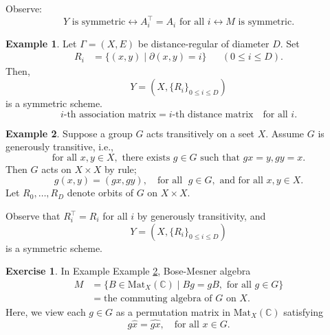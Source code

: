 \documentclass[
]{book}
\theoremstyle{definition}
\theoremstyle{definition}
\newtheorem{example}{Example}[chapter]
\theoremstyle{definition}
\newtheorem{exercise}{Exercise}[chapter]
\theoremstyle{definition}
\theoremstyle{remark}
\begin{document}
Observe:
\[Y \text{ is symmetric} \leftrightarrow A_i^\top = A_i \text{ for all } i \leftrightarrow M \text{ is symmetric}.\]

\begin{example}
\protect\hypertarget{exm:dr}{}\label{exm:dr}Let \(\Gamma = (X, E)\) be distance-regular of diameter \(D\). Set
\begin{align}
R_i & = \{(x,y)\mid \partial(x,y) = i\} && (0\leq i\leq D).
\end{align}
Then,
\[Y = (X, \{R_i\}_{0\leq i\leq D})\]
is a symmetric scheme.
\[i\text{-th association matrix} = i\text{-th distance matrix} \quad \text{for all $i$.}\]
\end{example}

\begin{example}
\protect\hypertarget{exm:gen-tr}{}\label{exm:gen-tr}Suppose a group \(G\) acts transitively on a seet \(X\). Assume \(G\) is generously transitive, i.e.,
\[\text{for all }x,y\in X, \text{ there exists }g\in G \text{ such that }gx = y, gy = x.\]
Then \(G\) acts on \(X\times X\) by rule;
\[g(x,y) = (gx, gy), \quad \text{for all }\; g\in G, \text{ and for all }x,y\in X.\]
Let \(R_0, \ldots, R_D\) denote orbits of \(G\) on \(X\times X\).

Observe that \(R_i^\top = R_i\) for all \(i\) by generously transitivity, and
\[Y = (X, \{R_i\}_{0\leq i\leq D})\]
is a symmetric scheme.
\end{example}

\begin{exercise}
\protect\hypertarget{exr:gen-tr-case}{}\label{exr:gen-tr-case}In Example Example \ref{exm:gen-tr}, Bose-Mesner algebra
\begin{align}
M & = \{B\in \mathrm{Mat}_X(\mathbb{C}) \mid Bg = gB, \text{ for all }g\in G\}\\
& = \text{the commuting algebra of $G$ on $X$.}
\end{align}
Here, we view each \(g\in G\) as a permutation matrix in \(\mathrm{Mat}_X(\mathbb{C})\) satisfying
\[g\hat{x} = \widehat{gx}, \quad \text{for all }x\in G.\]
\end{exercise}
\end{document}
